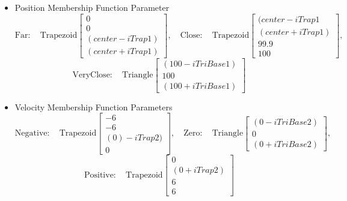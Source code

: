 \documentclass[submit]{aiaa-tc}%
\begin{document}
\begin{itemize}
 \item Position Membership Function Parameter
 \begin{displaymath}
 \mathrm{Far:}\quad \mathrm{Trapezoid}\begin{bmatrix}
 0\\0\\(center-iTrap1)\\(center+iTrap1)
 \end{bmatrix},
 \quad
 \mathrm{Close:}\quad \mathrm{Trapezoid}\begin{bmatrix}
 (center-iTrap1\\(center+iTrap1)\\99.9\\100
 \end{bmatrix},
 \end{displaymath}
 \begin{displaymath}
 \mathrm{VeryClose:}\quad \mathrm{Triangle}\begin{bmatrix}
 (100-iTriBase1)\\100\\ (100+iTriBase1)
 \end{bmatrix}
 \end{displaymath}
 
 \item Velocity Membership Function Parameters
 \begin{displaymath}
 \mathrm{Negative:}\quad \mathrm{Trapezoid}\begin{bmatrix}
 -6\\-6\\(0)-iTrap2)\\0
 \end{bmatrix},
 \quad
 \mathrm{Zero:}\quad \mathrm{Triangle}\begin{bmatrix}
 (0-iTriBase2)\\0\\ (0+iTriBase2)
 \end{bmatrix},
  \end{displaymath}
  \begin{displaymath}
 \mathrm{Positive:}\quad \mathrm{Trapezoid}\begin{bmatrix}
 0\\ (0+iTrap2)\\6\\6
 \end{bmatrix}
 \end{displaymath}
 

\end{itemize}
\end{document}
